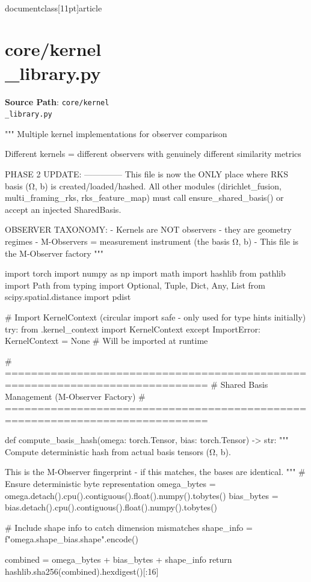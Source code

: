 \\documentclass[11pt]{article}
\begin{document}
\section*{core/kernel\\_library.py}
\textbf{Source Path}: \texttt{core/kernel\\_library.py}\par
\bigskip
\begin{CodeBlock}
"""
Multiple kernel implementations for observer comparison

Different kernels = different observers with genuinely different similarity metrics

PHASE 2 UPDATE:
--------------
This file is now the ONLY place where RKS basis (Ω, b) is created/loaded/hashed.
All other modules (dirichlet_fusion, multi_framing_rks, rks_feature_map) must
call ensure_shared_basis() or accept an injected SharedBasis.

OBSERVER TAXONOMY:
- Kernels are NOT observers - they are geometry regimes
- M-Observers = measurement instrument (the basis Ω, b)
- This file is the M-Observer factory
"""

import torch
import numpy as np
import math
import hashlib
from pathlib import Path
from typing import Optional, Tuple, Dict, Any, List
from scipy.spatial.distance import pdist

# Import KernelContext (circular import safe - only used for type hints initially)
try:
    from .kernel_context import KernelContext
except ImportError:
    KernelContext = None  # Will be imported at runtime


# =============================================================================
# Shared Basis Management (M-Observer Factory)
# =============================================================================

def compute_basis_hash(omega: torch.Tensor, bias: torch.Tensor) -> str:
    """
    Compute deterministic hash from actual basis tensors (Ω, b).
    
    This is the M-Observer fingerprint - if this matches, the bases are identical.
    """
    # Ensure deterministic byte representation
    omega_bytes = omega.detach().cpu().contiguous().float().numpy().tobytes()
    bias_bytes = bias.detach().cpu().contiguous().float().numpy().tobytes()
    
    # Include shape info to catch dimension mismatches
    shape_info = f"{omega.shape}_{bias.shape}".encode()
    
    combined = omega_bytes + bias_bytes + shape_info
    return hashlib.sha256(combined).hexdigest()[:16]



\end{CodeBlock}
\end{document}
